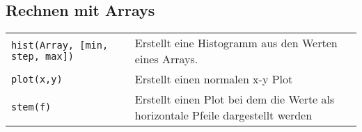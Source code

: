 \subsection{Rechnen mit Arrays}
\begin{tabularx}{\textwidth}{p{7cm} p{11cm}}
    \texttt{hist(Array, [min, step, max])} &
    Erstellt eine Histogramm aus den Werten eines Arrays.
  \\
    \texttt{plot(x,y)} &
    Erstellt einen normalen x-y Plot
  \\
    \texttt{stem(f)} &
    Erstellt einen Plot bei dem die Werte als horizontale Pfeile dargestellt
    werden
\end{tabularx}
    
